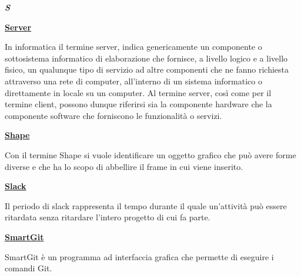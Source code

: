 \newpage
	
\cleardoublepage
{}
{}
\noindent\hrulefill\hspace{4mm}\textbf{\textsl{\Huge{S}}}\hspace{4mm}\hrulefill

\vspace*{2\bigskipamount}

\begin{addmargin}[0em]{0em}
	\textbf{\underline{Server}}
\end{addmargin} 
	
\medskip
\begin{addmargin}[5em]{1em}	
	In informatica il termine server, indica genericamente un componente o sottosistema informatico di elaborazione che fornisce, a livello logico e a livello fisico, un qualunque tipo di servizio ad altre componenti che ne fanno richiesta attraverso una rete di computer, all'interno di un sistema informatico o direttamente in locale su un computer.
Al termine server, così come per il termine client, possono dunque riferirsi sia la componente hardware che la componente software che forniscono le funzionalità o servizi.
\end{addmargin}

\bigskip
\begin{addmargin}[0em]{0em}
	\textbf{\underline{Shape}}
\end{addmargin} 
	
\medskip
\begin{addmargin}[5em]{1em}	
Con il termine Shape si vuole identificare un oggetto grafico che può avere forme diverse e che ha lo scopo di abbellire il frame in cui viene inserito.
\end{addmargin}	

\bigskip
\begin{addmargin}[0em]{0em}
	\textbf{\underline{Slack}}
\end{addmargin} 
	
\medskip
\begin{addmargin}[5em]{1em}	
Il periodo di slack rappresenta il tempo durante il quale un'attività può essere ritardata senza ritardare l'intero progetto di cui fa parte.
\end{addmargin}	

\bigskip
\begin{addmargin}[0em]{0em}		
	\textbf{\underline{SmartGit}}
\end{addmargin} 
	
\medskip
\begin{addmargin}[5em]{1em}	
SmartGit è un programma ad interfaccia grafica che permette di eseguire i comandi Git.	
\end{addmargin}	


